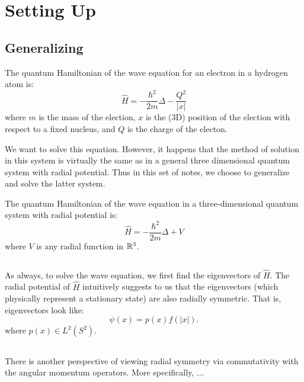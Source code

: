 \section{Setting Up}

\subsection{Generalizing}
The quantum Hamiltonian of the wave equation for an electron in a hydrogen atom is:
\[
    \hat{H} = - \frac{\hbar^2}{2m}\Delta - \frac{Q^2}{|x|}
\]
where $m$ is the mass of the election, $x$ is the (3D) position of the election with respect to a fixed nucleus, and $Q$ is the charge of the electon.

We want to solve this equation. However, it happens that the method of solution in this system is virtually the same as in a general three dimensional quantum system with radial potential. Thus in this set of notes, we choose to generalize and solve the latter system.

The quantum Hamiltonian of the wave equation in a three-dimensional quantum system with radial potential is:
\[
    \hat{H} = - \frac{\hbar^2}{2m}\Delta + V
\]
where $V$ is any radial function in ${\mathbb R}^3$.

\subsection{}
As always, to solve the wave equation, we first find the eigenvectors of $\hat{H}$. The radial potential of $\hat{H}$ intuitively suggests to us that the eigenvectors (which physically represent a stationary state) are also radially symmetric. That is, eigenvectors look like:
\[
    \psi(x) = p(x)f(|x|).
\]
where $p(x) \in L^2(S^2)$.

\subsection{}
There is another perspective of viewing radial symmetry via commutativity with the angular momentum operators. More specifically, ...
